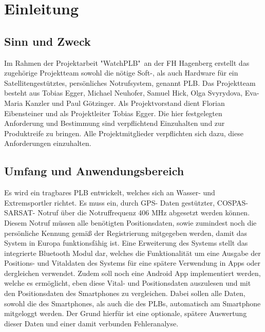 \newpage
\renewcommand*\contentsname{\hfill Inhaltsverzeichnis \hfill} %
\tableofcontents
\newpage

\setcounter{secnumdepth}{3} 		%
\section{Einleitung}
\subsection{Sinn und Zweck}
Im Rahmen der Projektarbeit "WatchPLB"\ an der FH Hagenberg erstellt das zugehörige Projektteam sowohl die nötige Soft-, als auch Hardware für ein Satellitengestütztes, persönliches Notrufsystem, genannt PLB. Das Projektteam besteht aus Tobias Egger, Michael Neuhofer, Samuel Hick, Olga Svyrydova, Eva- Maria Kanzler und Paul Götzinger. Als Projektvorstand dient Florian Eibensteiner und als Projektleiter Tobias Egger. Die hier festgelegten Anforderung und Bestimmung sind verpflichtend Einzuhalten und zur Produktreife zu bringen. Alle Projektmitglieder verpflichten sich dazu, diese Anforderungen einzuhalten.
\subsection{Umfang und Anwendungsbereich}
Es wird ein tragbares PLB entwickelt, welches sich an Wasser- und Extremsportler richtet. Es muss ein, durch GPS- Daten gestützter, COSPAS- SARSAT- Notruf über die Notruffrequenz 406 MHz abgesetzt werden können. Diesem Notruf müssen alle benötigten Positionsdaten, sowie zumindest noch die persönliche Kennung gemäß der Registrierung mitgegeben werden, damit das System in Europa funktionsfähig ist. Eine Erweiterung des Systems stellt das integrierte Bluetooth Modul dar, welches die Funktionalität um eine Ausgabe der Positions- und Vitaldaten des Systems für eine spätere Verwendung in Apps oder dergleichen verwendet. Zudem soll noch eine Android App implementiert werden, welche es ermöglicht, eben diese Vital- und Positionsdaten auszulesen und mit den Positionsdaten des Smartphones zu vergleichen. Dabei sollen alle Daten, sowohl die des Smartphones, als auch die des PLBs, automatisch am Smartphone mitgeloggt werden. Der Grund hierfür ist eine optionale, spätere Auswertung dieser Daten und einer damit verbunden Fehleranalyse.
